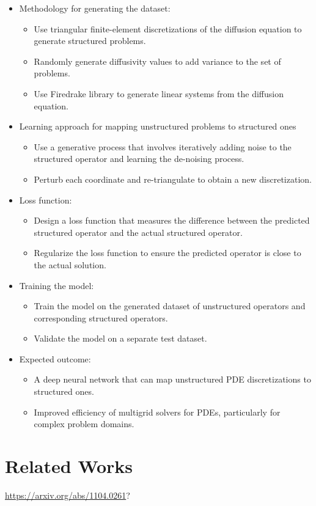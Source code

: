 \documentclass{article}
\begin{document}
\begin{itemize}
    \item Methodology for generating the dataset:
    \begin{itemize}
        \item Use triangular finite-element discretizations of the diffusion equation to generate structured problems.
        \item Randomly generate diffusivity values to add variance to the set of problems.
        \item Use Firedrake library to generate linear systems from the diffusion equation.
    \end{itemize}
    \item Learning approach for mapping unstructured problems to structured ones
    \begin{itemize}
        \item Use a generative process that involves iteratively adding noise to the structured operator and learning the de-noising process.
        \item Perturb each coordinate and re-triangulate to obtain a new discretization.
    \end{itemize}
    \item Loss function:
    \begin{itemize}
        \item Design a loss function that measures the difference between the predicted structured operator and the actual structured operator.
        \item Regularize the loss function to ensure the predicted operator is close to the actual solution.
    \end{itemize}
    \item Training the model:
    \begin{itemize}
        \item Train the model on the generated dataset of unstructured operators and corresponding structured operators.
        \item Validate the model on a separate test dataset.
    \end{itemize}
    \item Expected outcome:
    \begin{itemize}
        \item A deep neural network that can map unstructured PDE discretizations to structured ones.
        \item Improved efficiency of multigrid solvers for PDEs, particularly for complex problem domains.
    \end{itemize}
\end{itemize}
%
\section{Related Works}
\url{https://arxiv.org/abs/1104.0261}?
%


\end{document}
